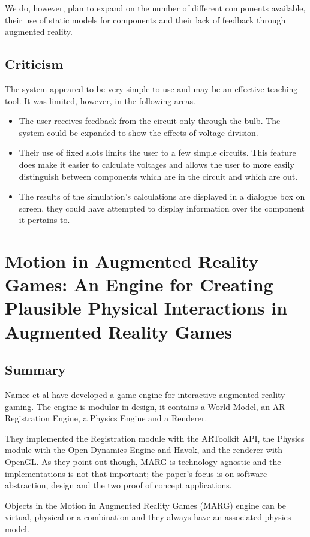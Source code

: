 We do, however, plan to expand on the number of different components available, their use of static models for components and their lack of feedback through augmented reality.

\subsection{Criticism}
The system appeared to be very simple to use and may be an effective teaching tool. It was limited, however, in the following areas.
\begin{itemize}
\item The user receives feedback from the circuit only through the bulb. The system could be expanded to show the effects of voltage division.
\item Their use of fixed slots limits the user to a few simple circuits. This feature does make it easier to calculate voltages and allows the user to more easily distinguish between components which are in the circuit and which are out. 
\item The results of the simulation's calculations are displayed in a dialogue box on screen, they could have attempted to display information over the component it pertains to.
\end{itemize}

\section{Motion in Augmented Reality Games: An Engine for Creating Plausible Physical Interactions in Augmented Reality Games}

\subsection{Summary}

Namee et al\cite{namee2010motion} have developed a game engine for interactive augmented reality gaming. The engine is modular in design, it contains a World Model, an AR Registration Engine, a Physics Engine and a Renderer. 

They implemented the Registration module with the ARToolkit API, the Physics module with the Open Dynamics Engine and Havok, and the renderer with OpenGL. As they point out though, MARG is technology agnostic and the implementations is not that important; the paper's focus is on software abstraction, design and the two proof of concept applications.

Objects in the Motion in Augmented Reality Games (MARG) engine can be virtual, physical or a combination and they always have an associated physics model.

